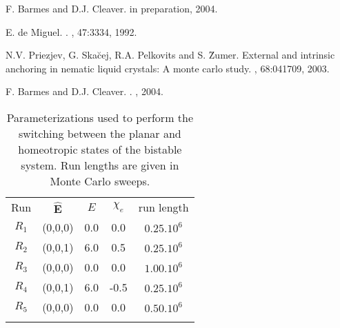 \documentclass[aps,10pt,twocolumn]{revtex4}
\newcommand{\vecth}[1]{ \mathbf{\hat{#1} } }
\newlength{\tabul}
\begin{document}
\begin{thebibliography}{10}
{F. Barmes and D.J. Cleaver}.
\newblock in preparation, 2004.

{E. de Miguel}.
.
, 47:3334, 1992.

{N.V. Priezjev, G. Ska\u{c}ej, R.A. Pelkovits and S. \u{Z}umer}.
\newblock External and intrinsic anchoring in nematic liquid crystals: A monte
  carlo study.
, 68:041709, 2003.

{F. Barmes and D.J. Cleaver}.
.
, 2004.

\end{thebibliography}

\clearpage
\newpage

\begin{table}
\centering
\begin{tabular}{||c||c||c||c||c||}
    \hhline{|t:=:t:=:t:=:t:=:t:=:t|}
    Run     &   $\vecth{E}$ &$E$    & $\chi_e$  &run length\\
    \hhline{|:=::=::=::=::=:|}
    $R_1$   &   (0,0,0)     &0.0    &0.0    &$0.25.10^6$\\
    $R_2$   &   (0,0,1)     &6.0    &0.5    &$0.25.10^6$\\
    $R_3$   &   (0,0,0)     &0.0    &0.0    &$1.00.10^6$\\
    $R_4$   &   (0,0,1)     &6.0    &-0.5   &$0.25.10^6$\\
    $R_5$   &   (0,0,0)     &0.0    &0.0    &$0.50.10^6$\\
    \hhline{|b:=:b:=:b:=:b:=:b:=:b|}
\end{tabular}
\caption{Parameterizations used to perform the switching between the planar and homeotropic states of the bistable
system. Run lengths are given in Monte Carlo sweeps.} \label{tble:bistFieldConditions}
\end{table}


\end{document}
